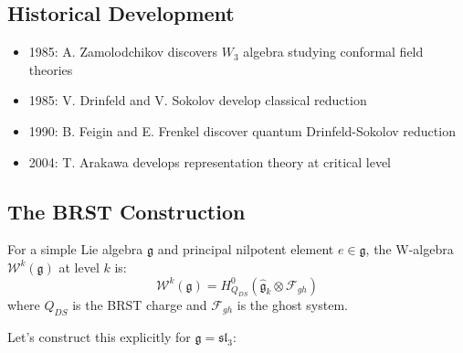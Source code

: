 \subsection{Historical Development}

\begin{itemize}
\item 1985: A. Zamolodchikov discovers $W_3$ algebra studying conformal field theories
\item 1985: V. Drinfeld and V. Sokolov develop classical reduction
\item 1990: B. Feigin and E. Frenkel discover quantum Drinfeld-Sokolov reduction
\item 2004: T. Arakawa develops representation theory at critical level
\end{itemize}

\subsection{The BRST Construction}

\begin{definition}
For a simple Lie algebra $\mathfrak{g}$ and principal nilpotent element $e \in \mathfrak{g}$, the W-algebra $\mathcal{W}^k(\mathfrak{g})$ at level $k$ is:
\[
\mathcal{W}^k(\mathfrak{g}) = H^0_{Q_{DS}}(\hat{\mathfrak{g}}_k \otimes \mathcal{F}_{gh})
\]
where $Q_{DS}$ is the BRST charge and $\mathcal{F}_{gh}$ is the ghost system.
\end{definition}

Let's construct this explicitly for $\mathfrak{g} = \mathfrak{sl}_3$:

